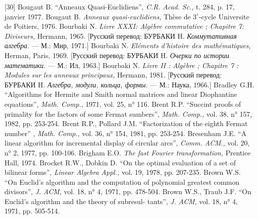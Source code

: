 \documentclass{../../template/mai_book}
\begin{document}
[30] Bougaut B. “Anneaux Quasi-Euclidiens”, {\itshape C.R. Acad. Sc.,} t. 284, p. 17, janvier 1977. \newline
[31] Bougaut B. {\itshape Anneaux quasi-euclidiens,} Th\`{e}se de $3^{\circ}$-cycle Universite de Poitiers, 1976. \newline
[32] Bourbaki N. {\itshape Livre XXXI: Alg\`{e}bre commutative ; Chapitre 7: Diviseurs,} Hermann, 1965. [Русский перевод: БУРБАКИ H. {\itshape Коммутативная алгебра.} — М.: Мир, 1971.] \newline
[33] Bourbaki N. {\itshape El\'{e}ments d’histoire des math\'{e}matiques,} Herman, Paris, 1969. [Русский перевод: БУРБАКИ H. {\itshape Очерки по истории математики.} — М.: Ил, 1963.] \newline
[34] Bourbaki N. {\itshape Livre II : Alg\`{e}bre ; Chapitre 7 : Modules sur les anneaux principaux,} Hermann, 1981. [Русский перевод: БУРБАКИ H. {\itshape Алгебра, модули, кольца, формы.} — М.: Наука, 1966.] \newline
[35] Bradley G.H. “Algorithms for Hermite and Smith normal matrices and
linear Diophantine equations”, {\itshape Math. Comp.,} 1971, vol. 25, n° 116. \newline
\newpage
\noindent
[36] Brent R.P. “Succint proofs of primality for the factors of some Fermat sumbers”, {\itshape Math. Comp.,} vol. 38, n° 157, 1982, pp. 253-254. \newline
[37] Brent R.P., Pollard J.M. “Factorization of the eighth Fermat number”
, {\itshape Math. Comp.,} vol. 36, n° 154, 1981, pp. 253-254. \newline
[38] Bresenham J.E. “A linear algorithm for incremental display of circular arcs”, {\itshape Comm. ACM.,} vol. 20, n° 2, 1977, pp. 100-106. \newline
[39] Brigham E.O. {\itshape The fast Fourier transformation,} Prentice Hall, 1974. \newline
[40] Brocket R.W., Dobkin D. “On the optimal evaluation of a set of
bilinear forms”, {\itshape Linear Algebra Appl.,} vol. 19, 1978, pp. 207-235. \newline
[41] Brown W.S. “On Euclid’s algorithm and the computation of polynomial
greatest common divisors”, {\itshape J. ACM,} vol. 18, n° 4, 1971, pp. 478-504. \newline
[42] Brown W.S., Traub J.F. “On Euclid’s algorithm and the theory of
subresul- \newline tants”, {\itshape J. ACM,} vol. 18, n° 4, 1971, pp. 505-514. \newline
\end{document}

